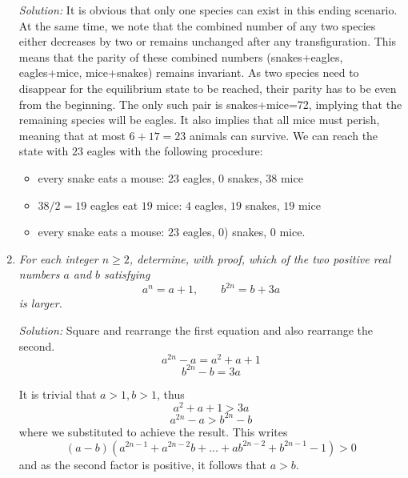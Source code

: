 \documentclass{article}
\begin{document}
\begin{enumerate}[1.]
\textit{Solution:}
It is obvious that only one species can exist in this ending scenario. At the same time, we note that the combined number of any two species either decreases by two or remains unchanged after any transfiguration. This means that the parity of these combined numbers (snakes+eagles, eagles+mice, mice+snakes) remains invariant.
As two species need to disappear for the equilibrium state to be reached, their parity has to be even from the beginning. The only such pair is snakes+mice=72, implying that the remaining species will be eagles.
It also implies that all mice must perish, meaning that at most $6+17=23$ animals can survive. We can reach the state with $23$ eagles with the following procedure:
\begin{itemize}
  \item every snake eats a mouse: 23 eagles, 0 snakes, 38 mice
  \item $38/2=19$ eagles eat $19$ mice: $4$ eagles, $19$ snakes, $19$ mice
  \item every snake eats a mouse: $23$ eagles, $0$) snakes, $0$ mice.
\end{itemize}

\vspace{6.81mm}

\item %
{\itshape
For each integer $n \geq 2$, determine, with proof, which of the two positive real numbers $a$ and $b$ satisfying
\[ a^n = a+1, \qquad b^{2n} = b+3a \]
is larger.}

\textit{Solution:}
Square and rearrange the first equation and also rearrange the second.
$$a^{2n} - a = a^2 + a + 1$$
$$b^{2n} - b = 3a$$

It is trivial that $a > 1, b > 1$, thus
$$a^2 + a + 1 > 3a$$
$$a^{2n} - a > b^{2n} - b$$
where we substituted to achieve the result. This writes
$$(a - b)(a^{2n - 1} + a^{2n - 2}b + \dots + ab^{2n - 2} + b^{2n - 1} - 1) > 0$$ 
and as the second factor is positive, it follows that $a > b$.


\end{enumerate}
\end{document}
